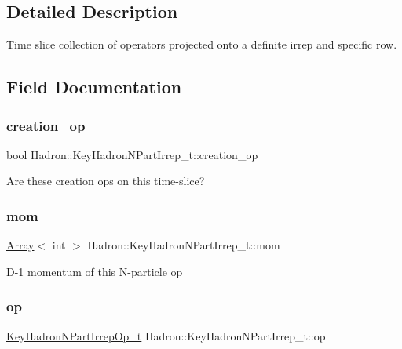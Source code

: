 \subsection{Detailed Description}
Time slice collection of operators projected onto a definite irrep and specific row. 

\subsection{Field Documentation}
\mbox{\label{structHadron_1_1KeyHadronNPartIrrep__t_aa0e6dbc61ba14fdacef1be61ce5971b2}} 
\subsubsection{\texorpdfstring{creation\_op}{creation\_op}}
{\footnotesize\ttfamily bool Hadron\+::\+Key\+Hadron\+N\+Part\+Irrep\+\_\+t\+::creation\+\_\+op}

Are these creation ops on this time-\/slice? \mbox{\label{structHadron_1_1KeyHadronNPartIrrep__t_a4889bc591015cf78026b943bce731f34}} 
\subsubsection{\texorpdfstring{mom}{mom}}
{\footnotesize\ttfamily \mbox{\hyperlink{classXMLArray_1_1Array}{Array}}$<$ int $>$ Hadron\+::\+Key\+Hadron\+N\+Part\+Irrep\+\_\+t\+::mom}

D-\/1 momentum of this N-\/particle op \mbox{\label{structHadron_1_1KeyHadronNPartIrrep__t_ab0dc5eaef88fc3a8149bcabffea44212}} 
\subsubsection{\texorpdfstring{op}{op}}
{\footnotesize\ttfamily \mbox{\hyperlink{structHadron_1_1KeyHadronNPartIrrepOp__t}{Key\+Hadron\+N\+Part\+Irrep\+Op\+\_\+t}} Hadron\+::\+Key\+Hadron\+N\+Part\+Irrep\+\_\+t\+::op}

